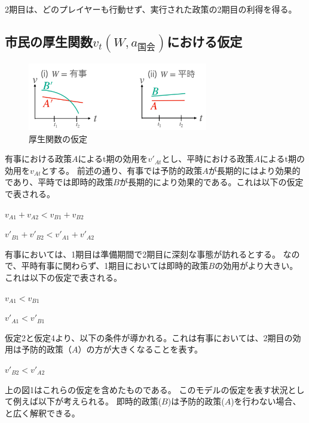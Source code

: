 \documentclass[main.tex]{subfiles}
\begin{document}
2期目は、どのプレイヤーも行動せず、実行された政策の2期目の利得を得る。




\subsection{市民の厚生関数$v_t(W, a_{国会})$における仮定}

\begin{figure}[htbp]
  \centering
  \includegraphics[width=0.7\textwidth]{./image/assumption_welfare_policy.png}
  \caption{厚生関数の仮定} 
  \label{fig:assumption_welfare_policy}
\end{figure}

有事における政策$A$によるt期の効用を$v'_{At}$とし、平時における政策$A$によるt期の効用を$v_{At}$とする。
前述の通り、有事では予防的政策$A$が長期的にはより効果的であり、平時では即時的政策$B$が長期的により効果的である。これは以下の仮定で表される。
\begin{assumption}  $v_{A1} + v_{A2} < v_{B1} + v_{B2}$ \end{assumption}
\begin{assumption}  $v'_{B1} + v'_{B2} < v'_{A1} + v'_{A2}$ \end{assumption}


有事においては、1期目は準備期間で2期目に深刻な事態が訪れるとする。
なので、平時有事に関わらず、1期目においては即時的政策$B$の効用がより大きい。これは以下の仮定で表される。
\begin{assumption}  $v_{A1} < v_{B1}$  \end{assumption}
\begin{assumption}  $v'_{A1} < v'_{B1}$ \end{assumption}

仮定2と仮定4より、以下の条件が導かれる。これは有事においては、2期目の効用は予防的政策（$A$）の方が大きくなることを表す。
\begin{condition}  $v'_{B2} < v'_{A2}$ \end{condition}


上の図1はこれらの仮定を含めたものである。
このモデルの仮定を表す状況として例えば以下が考えられる。
即時的政策($B$)は予防的政策($A$)を行わない場合、と広く解釈できる。
\end{document}
